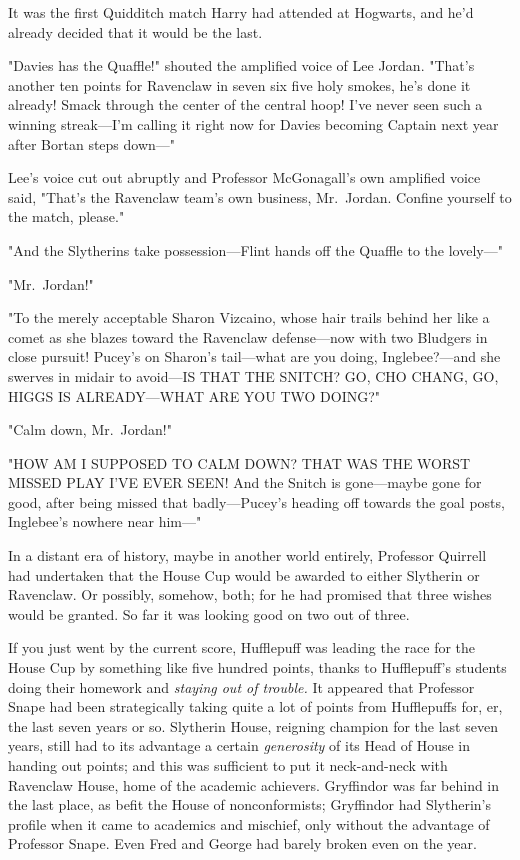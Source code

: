 It was the first Quidditch match Harry had attended at Hogwarts, and he'd
already decided that it would be the last.

"Davies has the Quaffle!" shouted the amplified voice of Lee Jordan. "That's
another ten points for Ravenclaw in seven{\el} six{\el} five{\el} holy
smokes, he's done it already! Smack through the center of the central hoop!
I've never seen such a winning streak---I'm calling it right now for Davies
becoming Captain next year after Bortan steps down\mbox{---}"

Lee's voice cut out abruptly and Professor McGonagall's own amplified voice
said, "That's the Ravenclaw team's own business, Mr.~Jordan. Confine yourself
to the match, please."

"And the Slytherins take possession---Flint hands off the Quaffle to the
lovely\mbox{---}"

"Mr.~Jordan!"

"To the merely acceptable Sharon Vizcaino, whose hair trails behind her like a
comet as she blazes toward the Ravenclaw defense---now with two Bludgers in
close pursuit! Pucey's on Sharon's tail---what are you doing, Inglebee?---and
she swerves in midair to avoid---IS THAT THE SNITCH? GO, CHO CHANG, GO, HIGGS
IS ALREADY---WHAT ARE YOU TWO DOING?"

"Calm down, Mr.~Jordan!"

"HOW AM I SUPPOSED TO CALM DOWN? THAT WAS THE WORST MISSED PLAY I'VE EVER SEEN!
And the Snitch is gone---maybe gone for good, after being missed that
badly---Pucey's heading off towards the goal posts, Inglebee's nowhere near
him\mbox{---}"

In a distant era of history, maybe in another world entirely, Professor
Quirrell had undertaken that the House Cup would be awarded to either Slytherin
or Ravenclaw. Or possibly, somehow, both; for he had promised that three wishes
would be granted. So far it was looking good on two out of three.

If you just went by the current score, Hufflepuff was leading the race for the
House Cup by something like five hundred points, thanks to Hufflepuff's
students doing their homework and \emph{staying out of trouble.} It appeared
that Professor Snape had been strategically taking quite a lot of points from
Hufflepuffs for, er, the last seven years or so. Slytherin House, reigning
champion for the last seven years, still had to its advantage a certain
\emph{generosity} of its Head of House in handing out points; and this was
sufficient to put it neck-and-neck with Ravenclaw House, home of the academic
achievers. Gryffindor was far behind in the last place, as befit the House of
nonconformists; Gryffindor had Slytherin's profile when it came to academics
and mischief, only without the advantage of Professor Snape. Even Fred and
George had barely broken even on the year.

